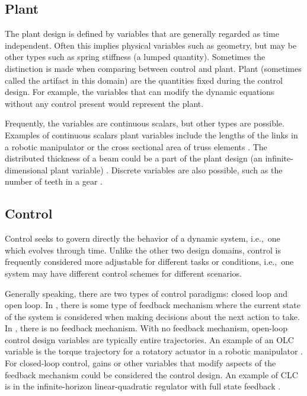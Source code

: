\subsection{Plant\label{sec:ch1:plant}}

The plant design is defined by variables that are generally regarded as time independent.
Often this implies physical variables such as geometry, but may be other types such as spring stiffness (a lumped quantity).
Sometimes the distinction is made when comparing between control and plant. Plant (sometimes called the artifact in this domain) are the quantities fixed during the control design. 
For example, the variables that can modify the dynamic equations without any control present would represent the plant.

Frequently, the variables are continuous scalars, but other types are possible. 
Examples of continuous scalars plant variables include the lengths of the links in a robotic manipulator \cite{Allison2013d} or the cross sectional area of truss elements \cite{Bendsoe2004a}.
The distributed thickness of a beam could be a part of the plant design (an infinite-dimensional plant variable) \cite{Chilan2017a}.
Discrete variables are also possible, such as the number of teeth in a gear \cite{Budynas2014a}.

\subsection{Control\label{sec:ch1:control}}

Control seeks to govern directly the behavior of a dynamic system, i.e.,~one which evolves through time.
Unlike the other two design domains, control is frequently considered more adjustable for different tasks or conditions, i.e.,~one system may have different control schemes for different scenarios.

Generally speaking, there are two types of control paradigms: closed loop and open loop.
In , there is some type of feedback mechanism where the current state of the system is considered when making decisions about the next action to take.
In , there is no feedback mechanism.
With no feedback mechanism, open-loop control design variables are typically entire trajectories.
An example of an OLC variable is the torque trajectory for a rotatory actuator in a robotic manipulator \cite{Allison2013d}.
For closed-loop control, gains or other variables that modify aspects of the feedback mechanism could be considered the control design.
An example of CLC is in the infinite-horizon linear-quadratic regulator with full state feedback \cite{Liberzon2012a}.

